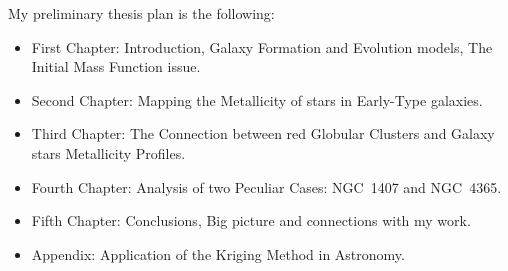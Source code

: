 My preliminary thesis plan is the following:
\begin{itemize}
\item{First Chapter: } Introduction, Galaxy Formation and Evolution models, The Initial Mass Function issue.
\item{Second Chapter:} Mapping the Metallicity of stars in Early-Type galaxies.
\item{Third Chapter:} The Connection between red Globular Clusters and Galaxy stars Metallicity Profiles.
\item{Fourth Chapter:} Analysis of two Peculiar Cases: NGC~1407 and NGC~4365.
\item{Fifth Chapter:} Conclusions, Big picture and connections with my work.
\item{Appendix:} Application of the Kriging Method in Astronomy.
\end{itemize}

